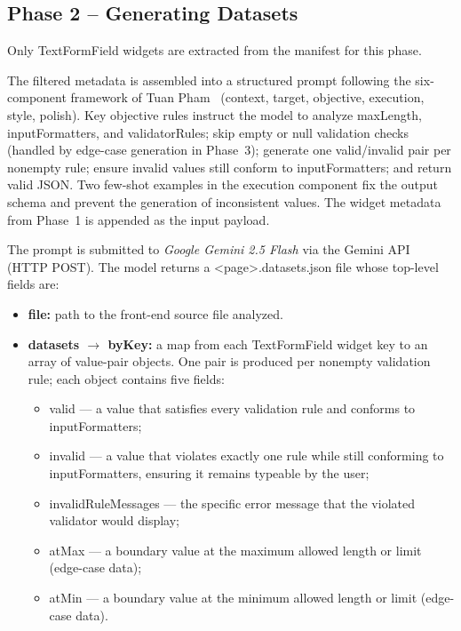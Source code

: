 \documentclass[conference]{IEEEtran}
\renewcommand{\texttt}[1]{\textnormal{#1}}
\begin{document}
\subsection{Phase 2 -- Generating Datasets}

Only \texttt{TextFormField} widgets are extracted from the manifest
for this phase.

The filtered metadata is assembled into a structured prompt following
the six-component framework of Tuan Pham~\cite{b4} (context, target,
objective, execution, style, polish). Key objective rules instruct the
model to analyze \texttt{maxLength}, \texttt{inputFormatters}, and
\texttt{validatorRules}; skip empty or null validation checks
(handled by edge-case generation in Phase~3); generate one valid/invalid
pair per nonempty rule; ensure invalid values still conform to
\texttt{inputFormatters}; and return valid JSON. Two few-shot examples
in the execution component fix the output schema and prevent the generation of inconsistent values. The widget metadata from Phase~1 is appended as the input payload.

The prompt is submitted to \textit{Google Gemini 2.5 Flash}
\cite{b5} via the Gemini API (HTTP POST). The model returns a
\texttt{<page>.datasets.json} file whose top-level fields are:

\begin{itemize}
  \item \textbf{file:} path to the front-end source file analyzed.
  \item \textbf{datasets $\to$ byKey:} a map from each
        \texttt{TextFormField} widget key to an array of value-pair
        objects. One pair is produced per nonempty validation rule;
        each object contains five fields:
        \begin{itemize}
          \item \texttt{valid} --- a value that satisfies every
                validation rule and conforms to
                \texttt{inputFormatters};
          \item \texttt{invalid} --- a value that violates exactly
                one rule while still conforming to
                \texttt{inputFormatters}, ensuring it remains
                typeable by the user;
          \item \texttt{invalidRuleMessages} --- the specific error
                message that the violated validator would display;
          \item \texttt{atMax} --- a boundary value at the maximum
                allowed length or limit (edge-case data);
          \item \texttt{atMin} --- a boundary value at the minimum
                allowed length or limit (edge-case data).
        \end{itemize}
\end{itemize}
\end{document}
